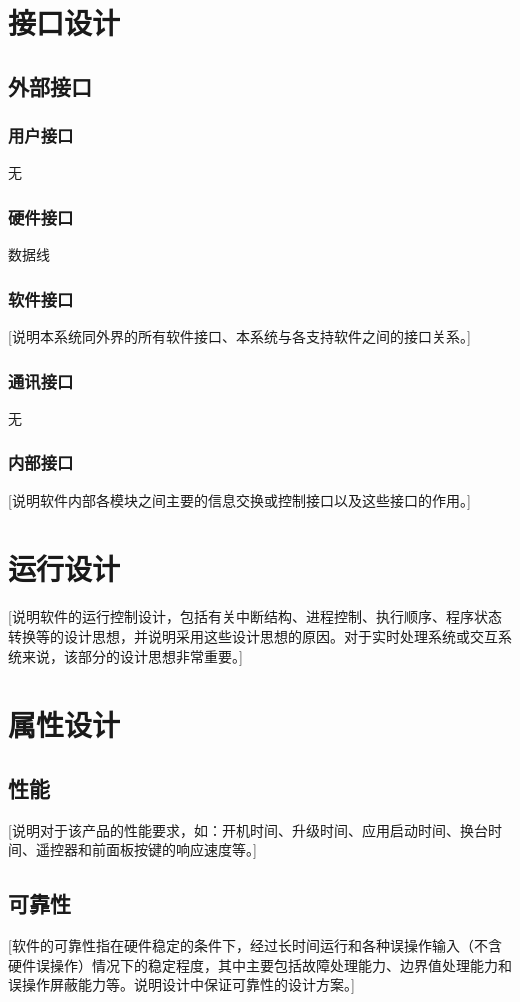 \documentclass[10pt,a4paper,titlepage]{article} %
\begin{document}
\section{接口设计}
\subsection{外部接口}
\subsubsection{用户接口}
无
\subsubsection{硬件接口}
数据线
\subsubsection{软件接口}
[说明本系统同外界的所有软件接口、本系统与各支持软件之间的接口关系。]\newline

\subsubsection{通讯接口}
无
\subsubsection{内部接口}
[说明软件内部各模块之间主要的信息交换或控制接口以及这些接口的作用。]\newline
\section{运行设计}
[说明软件的运行控制设计，包括有关中断结构、进程控制、执行顺序、程序状态转换等的设计思想，并说明采用这些设计思想的原因。对于实时处理系统或交互系统来说，该部分的设计思想非常重要。]\newline
\section{属性设计}
\subsection{性能}
[说明对于该产品的性能要求，如：开机时间、升级时间、应用启动时间、换台时间、遥控器和前面板按键的响应速度等。]\newline
\subsection{可靠性}
[软件的可靠性指在硬件稳定的条件下，经过长时间运行和各种误操作输入（不含硬件误操作）情况下的稳定程度，其中主要包括故障处理能力、边界值处理能力和误操作屏蔽能力等。说明设计中保证可靠性的设计方案。]\newline
\end{document}
